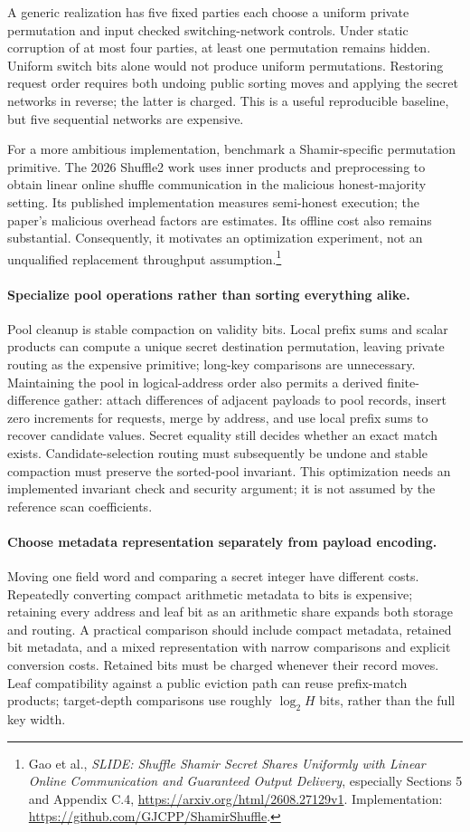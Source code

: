 A generic realization has five fixed parties each choose a uniform private
permutation and input checked switching-network controls. Under static
corruption of at most four parties, at least one permutation remains hidden.
Uniform switch bits alone would not produce uniform permutations. Restoring
request order requires both undoing public sorting moves and applying the
secret networks in reverse; the latter is charged. This is a useful
reproducible baseline, but five sequential networks are expensive.

For a more ambitious implementation, benchmark a Shamir-specific permutation
primitive. The 2026 Shuffle2 work uses inner products and preprocessing to
obtain linear online shuffle communication in the malicious honest-majority
setting. Its published implementation measures semi-honest execution; the
paper's malicious overhead factors are estimates. Its offline cost also
remains substantial. Consequently, it motivates an optimization experiment,
not an unqualified replacement throughput assumption.\footnote{Gao et al.,
\emph{SLIDE: Shuffle Shamir Secret Shares Uniformly with Linear Online
Communication and Guaranteed Output Delivery}, especially Sections 5 and
Appendix C.4, \url{https://arxiv.org/html/2608.27129v1}.
Implementation: \url{https://github.com/GJCPP/ShamirShuffle}.}

\paragraph{Specialize pool operations rather than sorting everything alike.}
Pool cleanup is stable compaction on validity bits. Local prefix sums and
scalar products can compute a unique secret destination permutation, leaving
private routing as the expensive primitive; long-key comparisons are
unnecessary. Maintaining the pool in logical-address order also permits a
derived finite-difference gather: attach differences of adjacent payloads to
pool records, insert zero increments for requests, merge by address, and use
local prefix sums to recover candidate values. Secret equality still decides
whether an exact match exists. Candidate-selection routing must subsequently
be undone and stable compaction must preserve the sorted-pool invariant.
This optimization needs an implemented invariant check and security argument;
it is not assumed by the reference scan coefficients.

\paragraph{Choose metadata representation separately from payload encoding.}
Moving one field word and comparing a secret integer have different costs.
Repeatedly converting compact arithmetic metadata to bits is expensive;
retaining every address and leaf bit as an arithmetic share expands both
storage and routing. A practical comparison should include compact metadata,
retained bit metadata, and a mixed representation with narrow comparisons
and explicit conversion costs. Retained bits must be charged whenever their
record moves. Leaf compatibility against a public eviction path can reuse
prefix-match products; target-depth comparisons use roughly $\log_2 H$ bits,
rather than the full key width.


